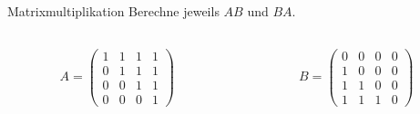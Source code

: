 \begin{frame}{Matrixmultiplikation}
    Berechne jeweils $AB$ und $BA$.
    \begin{columns}
        \begin{column}{.5\textwidth}
            \begin{align*}
                A = \begin{pmatrix}
                    1 & 1 & 1 & 1\\
                    0 & 1 & 1 & 1\\
                    0 & 0 & 1 & 1\\
                    0 & 0 & 0 & 1
                \end{pmatrix}
            \end{align*}
        \end{column}
        \begin{column}{.5\textwidth}
            \begin{align*}
                B = \begin{pmatrix}
                    0 & 0 & 0 & 0\\
                    1 & 0 & 0 & 0\\
                    1 & 1 & 0 & 0\\
                    1 & 1 & 1 & 0
                    \end{pmatrix}
            \end{align*}
        \end{column}
    \end{columns}
\end{frame}
